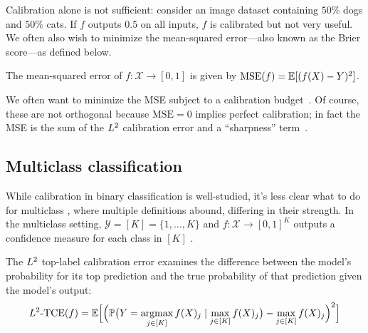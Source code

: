 Calibration alone is not sufficient: consider an image dataset containing $50\%$ dogs and $50\%$ cats.
If $f$ outputs $0.5$ on all inputs, $f$ is calibrated but not very useful.
We often also wish to minimize the mean-squared error---also known as the Brier score---as defined below.

\begin{definition}
The mean-squared error of $f : \mathcal{X} \to [0, 1]$ is given by $\textup{MSE}(f) = \mathbb{E}[(f(X) - Y)^2]$.
\end{definition}

We often want to minimize the MSE subject to a calibration budget~\cite{gneiting2005weather, gneiting2007probabilistic}. Of course, these  are not orthogonal  because $\mbox{MSE} = 0$ implies perfect calibration; in fact the MSE is the sum of the $L^2$ calibration error and a ``sharpness'' term~\cite{murphy1973vector,degroot1983forecasters, kuleshov2015calibrated}.

\subsection{Multiclass classification}

While calibration in binary classification is  well-studied,
it's less clear what to do for multiclass , where multiple definitions abound, differing in their strength. In the multiclass setting, $\mathcal{Y} = [K] = \{1, \dots, K\}$ and $f : \mathcal{X} \to [0, 1]^K$ outputs a confidence measure for each class in $[K]$ .

\begin{definition}
The $L^2$ top-label calibration error examines the difference between the model's probability for its top prediction and the true probability of that prediction given the model's output:
\begin{align}
L^2\textup{-TCE}(f) = \mathbb{E}\Big[ \Big( \mathbb{P}\big(Y = \mathop{\mbox{argmax}}_{j \in [K]} f(X)_j \mid \max_{j \in [K]} f(X)_j\big) - \max_{j \in [K]} f(X)_j \Big)^2 \Big]
\end{align}
\end{definition}



